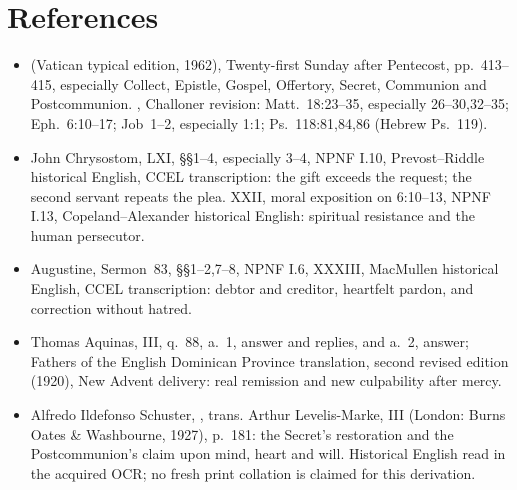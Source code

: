 \section{References}
\begin{itemize}
\item {} (Vatican typical edition, 1962), Twenty-first
Sunday after Pentecost, pp.~413--415, especially Collect, Epistle,
Gospel, Offertory, Secret, Communion and Postcommunion.
, Challoner revision: Matt.~18:23--35,
especially 26--30,32--35; Eph.~6:10--17; Job~1--2, especially 1:1;
Ps.~118:81,84,86 (Hebrew Ps.~119).
\item John Chrysostom,  LXI, \S\S1--4,
especially 3--4, NPNF I.10, Prevost--Riddle historical English,
CCEL transcription: the gift exceeds the request; the second servant
repeats the plea.  XXII, moral exposition
on 6:10--13, NPNF I.13, Copeland--Alexander historical English:
spiritual resistance and the human persecutor.
\item Augustine, Sermon~83, \S\S1--2,7--8, NPNF I.6,
 XXXIII, MacMullen historical
English, CCEL transcription: debtor and creditor, heartfelt pardon,
and correction without hatred.
\item Thomas Aquinas,  III, q.~88, a.~1,
answer and replies, and a.~2, answer; Fathers of the English Dominican
Province translation, second revised edition (1920), New Advent delivery:
real remission and new culpability after mercy.
\item Alfredo Ildefonso Schuster, , trans.
Arthur Levelis-Marke, III (London: Burns Oates \& Washbourne, 1927),
p.~181: the Secret's restoration and the Postcommunion's claim upon
mind, heart and will. Historical English read in the acquired OCR;
no fresh print collation is claimed for this derivation.
\end{itemize}
